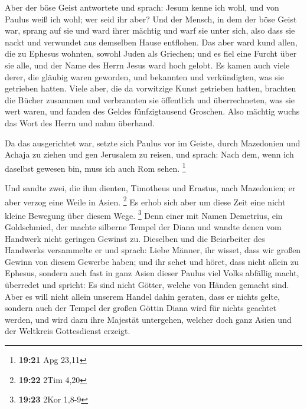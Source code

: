  Aber der böse Geist antwortete und sprach: Jesum kenne ich
wohl, und von Paulus weiß ich wohl; wer seid ihr aber?  Und
der Mensch, in dem der böse Geist war, sprang auf sie und ward ihrer
mächtig und warf sie unter sich, also dass sie nackt und verwundet aus
demselben Hause entflohen.  Das aber ward kund allen, die
zu Ephesus wohnten, sowohl Juden als Griechen; und es fiel eine Furcht
über sie alle, und der Name des Herrn Jesus ward hoch gelobt.
 Es kamen auch viele derer, die gläubig waren geworden, und
bekannten und verkündigten, was sie getrieben hatten. 
Viele aber, die da vorwitzige Kunst getrieben hatten, brachten die
Bücher zusammen und verbrannten sie öffentlich und überrechneten, was
sie wert waren, und fanden des Geldes fünfzigtausend Groschen.
 Also mächtig wuchs das Wort des Herrn und nahm überhand.

 Da das ausgerichtet war, setzte sich Paulus vor im Geiste,
durch Mazedonien und Achaja zu ziehen und gen Jerusalem zu reisen, und
sprach: Nach dem, wenn ich daselbst gewesen bin, muss ich auch Rom
sehen. \footnote{\textbf{19:21} Apg 23,11}

 Und sandte zwei, die ihm dienten, Timotheus und Erastus,
nach Mazedonien; er aber verzog eine Weile in Asien. \footnote{\textbf{19:22}
  2Tim 4,20}  Es erhob sich aber um diese Zeit eine nicht
kleine Bewegung über diesem Wege. \footnote{\textbf{19:23} 2Kor 1,8-9}
 Denn einer mit Namen Demetrius, ein Goldschmied, der
machte silberne Tempel der Diana und wandte denen vom Handwerk nicht
geringen Gewinst zu.  Dieselben und die Beiarbeiter des
Handwerks versammelte er und sprach: Liebe Männer, ihr wisset, dass wir
großen Gewinn von diesem Gewerbe haben;  und ihr sehet und
höret, dass nicht allein zu Ephesus, sondern auch fast in ganz Asien
dieser Paulus viel Volks abfällig macht, überredet und spricht: Es sind
nicht Götter, welche von Händen gemacht sind.  Aber es will
nicht allein unserem Handel dahin geraten, dass er nichts gelte, sondern
auch der Tempel der großen Göttin Diana wird für nichts geachtet werden,
und wird dazu ihre Majestät untergehen, welcher doch ganz Asien und der
Weltkreis Gottesdienst erzeigt.

